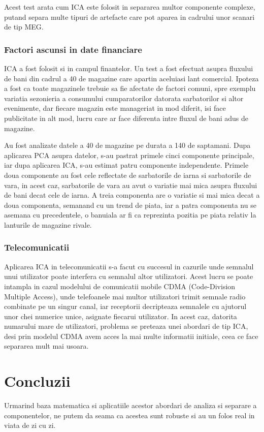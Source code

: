 \documentclass[12pt,oneside]{article}
\begin{document}
 Acest test arata cum ICA este folosit in separarea multor componente complexe, putand separa multe tipuri de artefacte care pot aparea in cadrului unor scanari de tip MEG.

 \subsubsection{Factori ascunsi in date financiare}
 ICA a fost folosit si in campul finantelor. Un test a fost efectuat asupra fluxului de bani din cadrul a 40 de magazine care apartin aceluiasi lant comercial. Ipoteza a fost ca toate magazinele trebuie sa fie afectate de factori comuni, spre exemplu variatia sezonieria a consumului cumparatorilor datorata sarbatorilor si altor evenimente, dar fiecare magazin este manageriat in mod diferit, isi face publicitate in alt mod, lucru care ar face diferenta intre fluxul de bani adus de magazine. 

 Au fost analizate datele a 40 de magazine pe durata a 140 de saptamani. Dupa aplicarea PCA asupra datelor, s-au pastrat primele cinci componente principale, iar dupa aplicarea ICA, s-au estimat patru componente independente. Primele doua componente au fost cele reflectate de sarbatorile de iarna si sarbatorile de vara, in acest caz, sarbatorile de vara au avut o variatie mai mica asupra fluxului de bani decat cele de iarna. A treia componenta are o variatie si mai mica decat a doua componenta, semanand cu un trend de piata, iar a patra componenta nu se asemana cu precedentele, o banuiala ar fi ca reprezinta pozitia pe piata relativ la lanturile de magazine rivale.

 \subsubsection{Telecomunicatii}
Aplicarea ICA in telecomunicatii s-a facut cu succesul in cazurile unde semnalul unui utilizator poate interfera cu semnalul altor utilizatori. Acest lucru se poate intampla in cazul modelului de comunicatii mobile CDMA (Code-Division Multiple Access), unde telefoanele mai multor utilizatori trimit semnale radio combinate pe un singur canal, iar receptorii decripteaza semnalele cu ajutorul unor chei numerice unice, asignate fiecarui utilizator. In acest caz, datorita numarului mare de utilizatori, problema se preteaza unei abordari de tip ICA, desi prin modelul CDMA avem acces la mai multe informatii initiale, ceea ce face separarea mult mai usoara.
\newpage
\section{Concluzii}
Urmarind baza matematica si aplicatiile acestor abordari de analiza si separare a componentelor, ne putem da seama ca acestea sunt robuste si au un folos real in viata de zi cu zi. 
\end{document}
